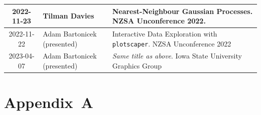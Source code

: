 \documentclass[12pt,a4paper]{article}
\begin{document}
\begin{table}[H]
\begin{tabular}{|c|l|p{10cm}|}
\hline

2022-11-23 & Tilman Davies & Nearest-Neighbour Gaussian Processes. \newline NZSA Unconference 2022. \\

\hline
%
2022-11-22 & Adam Bartonicek (presented) & Interactive Data Exploration with \texttt{plotscaper}. \newline NZSA Unconference 2022 \\
%
2023-04-07 & Adam Bartonicek (presented) & \textit{Same title as above}. \newline Iowa State University Graphics Group \\

\hline

\end{tabular}
\end{table}








\section*{Appendix~A}


\end{document}
